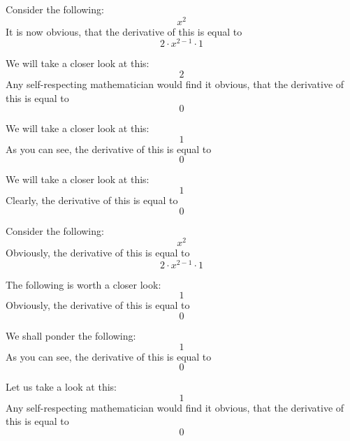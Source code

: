 \documentclass{article}
\begin{document}
Consider the following:
\begin{equation}
x ^{2 } 
\end{equation}
It is now obvious, that the derivative of this is equal to
\begin{equation}
2 \cdot x ^{2 - 1 } \cdot 1 
\end{equation}

We will take a closer look at this:
\begin{equation}
2 
\end{equation}
Any self-respecting mathematician would find it obvious, that the derivative of this is equal to
\begin{equation}
0 
\end{equation}

We will take a closer look at this:
\begin{equation}
1 
\end{equation}
As you can see, the derivative of this is equal to
\begin{equation}
0 
\end{equation}

We will take a closer look at this:
\begin{equation}
1 
\end{equation}
Clearly, the derivative of this is equal to
\begin{equation}
0 
\end{equation}

Consider the following:
\begin{equation}
x ^{2 } 
\end{equation}
Obviously, the derivative of this is equal to
\begin{equation}
2 \cdot x ^{2 - 1 } \cdot 1 
\end{equation}

The following is worth a closer look:
\begin{equation}
1 
\end{equation}
Obviously, the derivative of this is equal to
\begin{equation}
0 
\end{equation}

We shall ponder the following:
\begin{equation}
1 
\end{equation}
As you can see, the derivative of this is equal to
\begin{equation}
0 
\end{equation}

Let us take a look at this:
\begin{equation}
1 
\end{equation}
Any self-respecting mathematician would find it obvious, that the derivative of this is equal to
\begin{equation}
0 
\end{equation}
\end{document}
